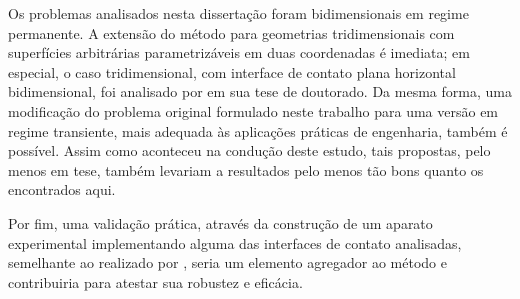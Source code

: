 Os problemas analisados nesta dissertação foram bidimensionais em regime permanente. A extensão do método para geometrias tridimensionais com superfícies arbitrárias parametrizáveis em duas coordenadas é imediata; em especial, o caso tridimensional, com interface de contato plana horizontal bidimensional, foi analisado por \cite{tese_camila} em sua tese de doutorado. Da mesma forma, uma modificação do problema original formulado neste trabalho para uma versão em regime transiente, mais adequada às aplicações práticas de engenharia, também é possível. Assim como aconteceu na condução deste estudo, tais propostas, pelo menos em tese, também levariam a resultados pelo menos tão bons quanto os encontrados aqui.

Por fim, uma validação prática, através da construção de um aparato experimental implementando alguma das interfaces de contato analisadas, semelhante ao realizado por \cite{tese_abreu}, seria um elemento agregador ao método e contribuiria para atestar sua robustez e eficácia.